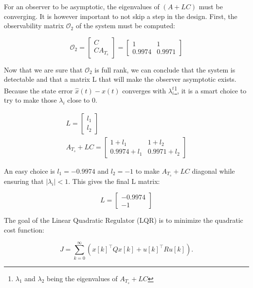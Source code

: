 For an observer to be asymptotic, the eigenvalues of $(A + LC)$ must be converging. It is however important to not skip
a step in the design. First, the observability matrix $\mathcal{O}_2$ of the system must be computed:

\begin{equation}
    \mathcal{O}_2 = 
    \begin{bmatrix}
        C\\
        C A_{T_s}
    \end{bmatrix}
    =
    \begin{bmatrix}
        1 & 1\\
        0.9974 & 0.9971
    \end{bmatrix}
\end{equation}

Now that we are sure that $\mathcal{O}_2$ is full rank, we can conclude that the system is detectable and that a matrix
L that will make the observer asymptotic exists. Because the state error $\hat{x}(t) - x(t)$ converges with 
$\lambda_i^t$\footnote{$\lambda_1$ and $\lambda_2$ being the eigenvalues of $A_{T_s} + LC$}, it is a smart choice to try to make
those $\lambda_i$ close to 0.

\begin{gather}
    L = \begin{bmatrix} l_1\\l_2 \end{bmatrix}\\
    A_{T_s} + L C = \begin{bmatrix} 1+l_1 & 1+l_2 \\ 0.9974+l_1 & 0.9971+l_2 \end{bmatrix}
\end{gather}

An easy choice is $l_1 = -0.9974$ and $l_2 = -1$ to make $A_{T_s} + LC$ diagonal while ensuring that $\left|\lambda_i
\right| < 1$. This gives the final L matrix:

\begin{equation}
    L = \begin{bmatrix}
        -0.9974 \\ -1
    \end{bmatrix}
\end{equation}
\fi

The goal of the Linear Quadratic Regulator (LQR) is to minimize the quadratic cost function:

\[
J = \sum_{k=0}^\infty \left( x[k]^\top Q x[k] + u[k]^\top R u[k] \right).
\]

